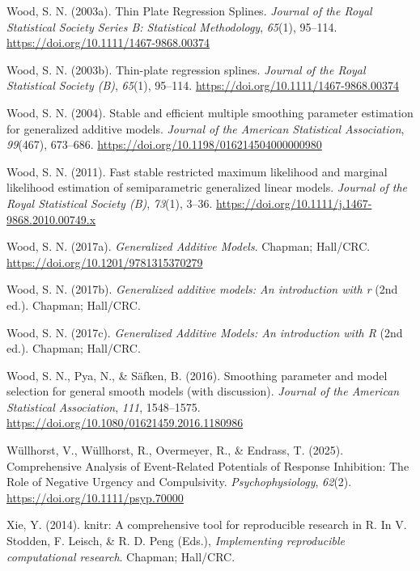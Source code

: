 \documentclass[
  doc,
  floatsintext,
  longtable,
  a4paper,
  nolmodern,
  notxfonts,
  notimes,
  colorlinks=true,linkcolor=blue,citecolor=blue,urlcolor=blue]{apa7}
\newlength{\cslhangindent}
\newenvironment{CSLReferences}[2] %
 {\begin{list}{}{%
  \setlength{\itemindent}{0pt}
  \setlength{\leftmargin}{0pt}
  \setlength{\parsep}{0pt}
  \ifodd #1
   \setlength{\leftmargin}{\cslhangindent}
   \setlength{\itemindent}{-1\cslhangindent}
  \fi
  \setlength{\itemsep}{#2\baselineskip}}}
 {\end{list}}
\begin{document}
\begin{CSLReferences}{1}{0}
Wood, S. N. (2003a). Thin Plate Regression Splines. \emph{Journal of the
Royal Statistical Society Series B: Statistical Methodology},
\emph{65}(1), 95--114. \url{https://doi.org/10.1111/1467-9868.00374}

Wood, S. N. (2003b). Thin-plate regression splines. \emph{Journal of the
Royal Statistical Society (B)}, \emph{65}(1), 95--114.
\url{https://doi.org/10.1111/1467-9868.00374}

Wood, S. N. (2004). Stable and efficient multiple smoothing parameter
estimation for generalized additive models. \emph{Journal of the
American Statistical Association}, \emph{99}(467), 673--686.
\url{https://doi.org/10.1198/016214504000000980}

Wood, S. N. (2011). Fast stable restricted maximum likelihood and
marginal likelihood estimation of semiparametric generalized linear
models. \emph{Journal of the Royal Statistical Society (B)},
\emph{73}(1), 3--36.
\url{https://doi.org/10.1111/j.1467-9868.2010.00749.x}

Wood, S. N. (2017a). \emph{Generalized Additive Models}. Chapman;
Hall/CRC. \url{https://doi.org/10.1201/9781315370279}

Wood, S. N. (2017b). \emph{Generalized additive models: An introduction
with r} (2nd ed.). Chapman; Hall/CRC.

Wood, S. N. (2017c). \emph{Generalized {A}dditive {M}odels: An
introduction with {R}} (2nd ed.). Chapman; Hall/CRC.

Wood, S. N., Pya, N., \& Säfken, B. (2016). Smoothing parameter and
model selection for general smooth models (with discussion).
\emph{Journal of the American Statistical Association}, \emph{111},
1548--1575. \url{https://doi.org/10.1080/01621459.2016.1180986}

Wüllhorst, V., Wüllhorst, R., Overmeyer, R., \& Endrass, T. (2025).
Comprehensive Analysis of Event{-}Related Potentials of Response
Inhibition: The Role of Negative Urgency and Compulsivity.
\emph{Psychophysiology}, \emph{62}(2).
\url{https://doi.org/10.1111/psyp.70000}

Xie, Y. (2014). {knitr}: A comprehensive tool for reproducible research
in {R}. In V. Stodden, F. Leisch, \& R. D. Peng (Eds.),
\emph{Implementing reproducible computational research}. Chapman;
Hall/CRC.


\end{CSLReferences}
\end{document}
